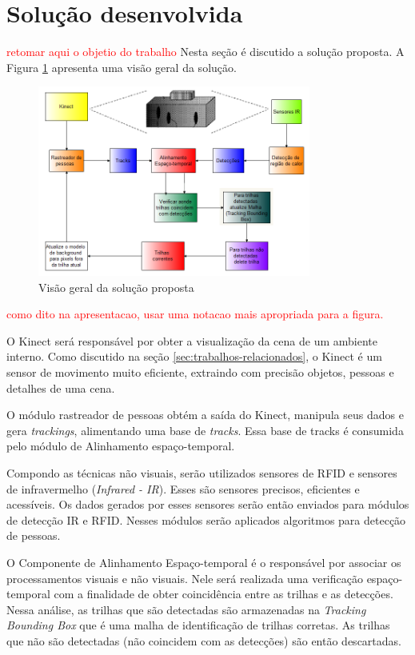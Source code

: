 \section{Solução desenvolvida}\label{sec:solucao-desenvolvida}
\textcolor{red}{retomar aqui o objetio do trabalho}
Nesta seção é discutido a solução proposta. A Figura \ref{fig:visao-geral} apresenta uma visão geral da solução.

\begin{figure}[ht]
\centering
\includegraphics[width=0.8\textwidth]{images/diagrama_final.png}
\caption{Visão geral da solução proposta}
\label{fig:visao-geral}
\end{figure}

\textcolor{red}{como dito na apresentacao, usar uma notacao mais apropriada para a figura.}

O Kinect será responsável por obter a visualização da cena de um ambiente interno. Como discutido na seção \ref{sec:trabalhos-relacionados}, o Kinect é um sensor de movimento muito eficiente, extraindo com precisão objetos, pessoas e detalhes de uma cena. 

O módulo rastreador de pessoas obtém a saída do Kinect, manipula seus dados e gera \textit{trackings}, alimentando uma base de \textit{tracks}. Essa base de tracks é consumida pelo módulo de Alinhamento espaço-temporal. 

Compondo as técnicas não visuais, serão utilizados sensores de RFID e sensores de infravermelho (\textit{Infrared - IR}). Esses são sensores precisos, eficientes e acessíveis. Os dados gerados por esses sensores serão então enviados para módulos de detecção IR e RFID. Nesses módulos serão aplicados algoritmos para detecção de pessoas.

O Componente de Alinhamento Espaço-temporal é o responsável por associar os processamentos visuais e não visuais. Nele será realizada uma verificação espaço-temporal com a finalidade de obter coincidência entre as trilhas e as detecções. Nessa análise, as trilhas que são detectadas são armazenadas na \textit{Tracking Bounding Box} que é uma malha de identificação de trilhas corretas. As trilhas que não são detectadas (não coincidem com as detecções) são então descartadas.

